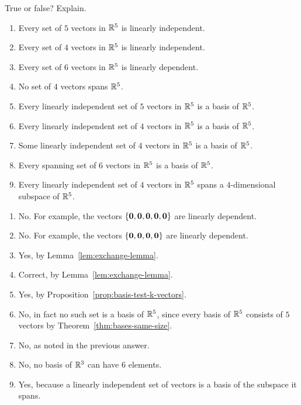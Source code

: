 \begin{enumialphparenastyle}
\begin{ex}
  True or false? Explain.
  \begin{enumerate}
  \item Every set of $5$ vectors in $\mathbb{R}^{5}$ is linearly independent.
  \item Every set of $4$ vectors in $\mathbb{R}^{5}$ is linearly independent.
  \item Every set of $6$ vectors in $\mathbb{R}^{5}$ is linearly dependent.
  \item No set of $4$ vectors spans $\mathbb{R}^{5}$.
  \item Every linearly independent set of $5$ vectors in $\mathbb{R}^5$ is a
    basis of $\mathbb{R}^5$.
  \item Every linearly independent set of $4$ vectors in $\mathbb{R}^5$ is a
    basis of $\mathbb{R}^5$.
  \item Some linearly independent set of $4$ vectors in $\mathbb{R}^5$ is a
    basis of $\mathbb{R}^5$.
  \item Every spanning set of $6$ vectors in $\mathbb{R}^5$ is a basis of
    $\mathbb{R}^5$.
  \item Every linearly independent set of $4$ vectors in $\mathbb{R}^5$ spans
    a $4$-dimensional subspace of $\mathbb{R}^5$.
  \end{enumerate}
  \begin{sol}
    \begin{enumerate}
    \item No. For example, the vectors
      $\left\{\mbox{\bf 0},\mbox{\bf 0},\mbox{\bf 0},\mbox{\bf 0},\mbox{\bf 0}\right\}$ are
      linearly dependent.
    \item No. For example, the vectors
      $\left\{\mbox{\bf 0},\mbox{\bf 0},\mbox{\bf 0},\mbox{\bf 0}\right\}$ are linearly
      dependent.
    \item Yes, by Lemma~\ref{lem:exchange-lemma}.
    \item Correct, by Lemma~\ref{lem:exchange-lemma}.
    \item Yes, by Proposition~\ref{prop:basis-test-k-vectors}.
    \item No, in fact no such set is a basis of $\mathbb{R}^5$, since every
      basis of $\mathbb{R}^5$ consists of $5$ vectors by
      Theorem~\ref{thm:bases-same-size}.
    \item No, as noted in the previous answer.
    \item No, no basis of $\mathbb{R}^3$ can have $6$ elements.
    \item Yes, because a linearly independent set of vectors is a
      basis of the subspace it spans.
    \end{enumerate}
  \end{sol}
\end{ex}


\end{enumialphparenastyle}
